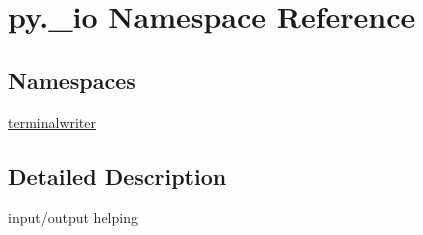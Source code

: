 \hypertarget{namespacepy_1_1__io}{}\section{py.\+\_\+io Namespace Reference}
\label{namespacepy_1_1__io}
\subsection*{Namespaces}
\begin{DoxyCompactItemize}
\item 
 \hyperlink{namespacepy_1_1__io_1_1terminalwriter}{terminalwriter}
\end{DoxyCompactItemize}


\subsection{Detailed Description}
\begin{DoxyVerb}input/output helping \end{DoxyVerb}
 